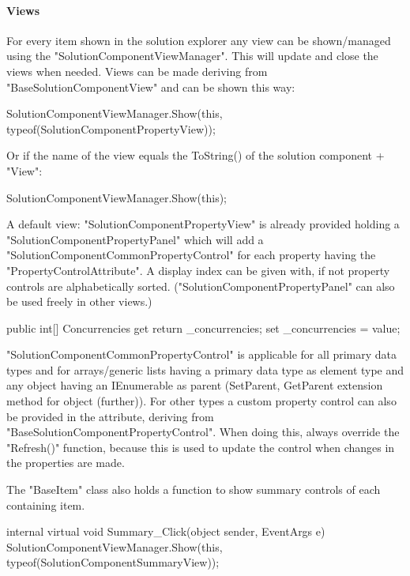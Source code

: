 \paragraph{Views}
For every item shown in the solution explorer any view can be shown/managed using the "SolutionComponentViewManager". This will update and close the views when needed.
Views can be made deriving from "BaseSolutionComponentView" and can be shown this way:
\begin{codelisting}
SolutionComponentViewManager.Show(this, typeof(SolutionComponentPropertyView));
\end{codelisting}

Or if the name of the view equals the ToString() of the solution component + "View":
\begin{codelisting}
SolutionComponentViewManager.Show(this);
\end{codelisting}

A default view: "SolutionComponentPropertyView" is already provided holding a "SolutionComponentPropertyPanel" which will add a "SolutionComponentCommonPropertyControl" for each property having the "PropertyControlAttribute".  A display index can be given with, if not property controls are alphabetically sorted.
("SolutionComponentPropertyPanel" can also be used freely in other views.)
\begin{codelisting}
public int[] Concurrencies
{
    get { return _concurrencies; }
    set { _concurrencies = value; }
}
\end{codelisting}

"SolutionComponentCommonPropertyControl" is applicable for all primary data types and for arrays/generic lists having a primary data type as element type and any object having an IEnumerable as parent (SetParent, GetParent extension method for object (further)).
For other types a custom property control can also be provided in the attribute, deriving from "BaseSolutionComponentPropertyControl".
 When doing this, always override the "Refresh()" function, because this is used to update the control when changes in the properties are made.

The "BaseItem" class also holds a function to show summary controls of each containing item.
\begin{codelisting}
internal virtual void Summary_Click(object sender, EventArgs e)
{
    SolutionComponentViewManager.Show(this, typeof(SolutionComponentSummaryView));
}
\end{codelisting}


